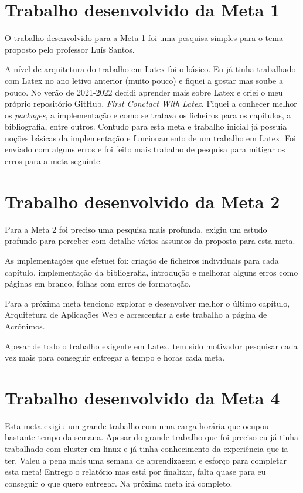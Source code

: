 \section{Trabalho desenvolvido da Meta 1}
O trabalho desenvolvido para a Meta 1 foi uma pesquisa simples para o tema proposto pelo professor Luís Santos. 

A nível de arquitetura do trabalho em Latex foi o básico. Eu já tinha trabalhado com Latex no ano letivo anterior (muito pouco) e fiquei a gostar mas soube a pouco. No verão de 2021-2022 decidi aprender mais sobre Latex e criei o meu próprio repositório GitHub, \textit{First Conctact With Latex}. Fiquei a conhecer melhor os \textit{packages}, a implementação e como se tratava os ficheiros para os capítulos, a bibliografia, entre outros. Contudo para esta meta e trabalho inicial já possuía noções básicas da implementação e funcionamento de um trabalho em Latex. Foi enviado com alguns erros e foi feito mais trabalho de pesquisa para mitigar os erros para a meta seguinte.


\section{Trabalho desenvolvido da Meta 2}
Para a Meta 2 foi preciso uma pesquisa mais profunda, exigiu um estudo profundo para perceber com detalhe vários assuntos da proposta para esta meta. 

As implementações que efetuei foi: criação de ficheiros individuais para cada capítulo, implementação da bibliografia, introdução e melhorar alguns erros como páginas em branco, folhas com erros de formatação. 

Para a próxima meta tenciono explorar e desenvolver melhor o último capítulo, Arquitetura de Aplicações Web e acrescentar a este trabalho a página de Acrónimos.

Apesar de todo o trabalho exigente em Latex, tem sido motivador pesquisar cada vez mais para conseguir entregar a tempo e horas cada meta.

\section{Trabalho desenvolvido da Meta 4}
Esta meta exigiu um grande trabalho com uma carga horária que ocupou bastante tempo da semana. Apesar do grande trabalho que foi preciso eu já tinha trabalhado com cluster em linux e já tinha conhecimento da experiência que ia ter. Valeu a pena mais uma semana de aprendizagem e esforço para completar esta meta!
Entrego o relatório mas está por finalizar, falta quase para eu conseguir o que quero entregar. Na próxima meta irá completo.

